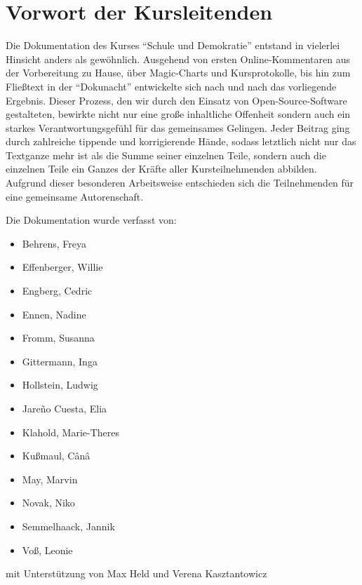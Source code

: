 \section[Vorwort]{Vorwort der Kursleitenden}

Die Dokumentation des Kurses ``Schule und Demokratie'' entstand in vielerlei Hinsicht anders als gewöhnlich.
Ausgehend von ersten Online-Kommentaren aus der Vorbereitung zu Hause, über Magic-Charts und Kursprotokolle, bis hin zum Fließtext in der ``Dokunacht'' entwickelte sich nach und nach das vorliegende Ergebnis.
Dieser Prozess, den wir durch den Einsatz von Open-Source-Software gestalteten, bewirkte nicht nur eine große inhaltliche Offenheit sondern auch ein starkes Verantwortungsgefühl für das gemeinsames Gelingen.
Jeder Beitrag ging durch zahlreiche tippende und korrigierende Hände, sodass letztlich nicht nur das Textganze mehr ist als die Summe seiner einzelnen Teile, sondern auch die einzelnen Teile ein Ganzes der Kräfte aller Kursteilnehmenden abbilden.
Aufgrund dieser besonderen Arbeitsweise entschieden sich die Teilnehmenden für eine gemeinsame Autorenschaft.

Die Dokumentation wurde verfasst von:
\begin{itemize}
\item[] Behrens, Freya
\item[] Effenberger, Willie
\item[] Engberg, Cedric
\item[] Ennen, Nadine
\item[] Fromm, Susanna
\item[] Gittermann, Inga
\item[] Hollstein, Ludwig
\item[] Jareño Cuesta, Elia
\item[] Klahold, Marie-Theres
\item[] Kußmaul, Cânâ
\item[] May, Marvin
\item[] Novak, Niko
\item[] Semmelhaack, Jannik
\item[] Voß, Leonie
\end{itemize}
mit Unterstützung von Max Held und Verena Kasztantowicz